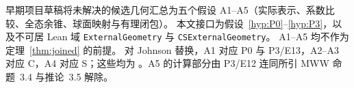 \begin{remark}[较早假设登记表]\label{sec:retired-assumptions}
早期项目草稿将未解决的候选几何汇总为五个假设 A1--A5（实际表示、系数比较、全态余锥、球面映射与有理闭包）。
本文接口为假设~\ref{hyp:P0}--\ref{hyp:P3}，以及不可居 Lean 域
\texttt{ExternalGeometry} 与 \texttt{CSExternalGeometry}。
A1--A5 均不作为定理~\ref{thm:joined} 的前提。
对 Johnson 替换，A1 对应 P0 与 P3/E13，A2--A3 对应 C，A4 对应 S；这些均为 \Open。A5 的计算部分由 P3/E12 连同所引 MWW 命题~3.4 与推论~3.5 解除。
\end{remark}
